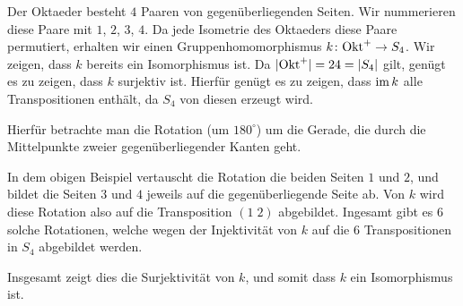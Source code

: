 Der Oktaeder besteht $4$ Paaren von gegenüberliegenden Seiten.
Wir nummerieren diese Paare mit $1$, $2$, $3$, $4$.
Da jede Isometrie des Oktaeders diese Paare permutiert, erhalten wir einen Gruppenhomomorphismus $k \colon \mathrm{Okt}^+ \to S_4$.
Wir zeigen, dass $k$ bereits ein Isomorphismus ist.
Da $|\mathrm{Okt}^+| = 24 = |S_4|$ gilt, genügt es zu zeigen, dass $k$ surjektiv ist.
Hierfür genügt es zu zeigen, dass $\operatorname{im} k$ alle Transpositionen enthält, da $S_4$ von diesen erzeugt wird.

Hierfür betrachte man die Rotation (um $180^\circ$) um die Gerade, die durch die Mittelpunkte zweier gegenüberliegender Kanten geht.
\begin{center}
\end{center}
In dem obigen Beispiel vertauscht die Rotation die beiden Seiten $1$ und $2$, und bildet die Seiten $3$ und $4$ jeweils auf die gegenüberliegende Seite ab.
Von $k$ wird diese Rotation also auf die Transposition $(1 \; 2)$ abgebildet.
Ingesamt gibt es $6$ solche Rotationen, welche wegen der Injektivität von $k$ auf die $6$ Transpositionen in $S_4$ abgebildet werden.

Insgesamt zeigt dies die Surjektivität von $k$, und somit dass $k$ ein Isomorphismus ist.




